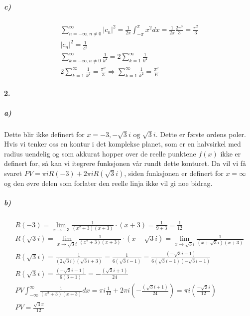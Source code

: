 \documentclass[11pt, A4paper,norsk]{article}
\begin{document}
			








			\subparagraph{c)}
				\begin{gather*}
\sum_{n = - \infty, n \neq 0}^{\infty} |c_n|^2 = \frac{1}{2 \pi} \int_{- \pi}^{\pi} x^2 dx = \frac{1}{2 \pi} \frac{2 \pi^3}{3} = \frac{\pi^2}{3} \\
|c_n|^2 = \frac{1}{c^2} \\
\sum_{k = - \infty, n \neq 0}^{\infty} \frac{1}{k^2} = 2 \sum_{k = 1}^{\infty} \frac{1}{k^2} \\
2 \sum_{k = 1}^{\infty} \frac{1}{k^2} = \frac{\pi^2}{3} \Rightarrow \sum_{k = 1}^{\infty} \frac{1}{k^2} = \frac{\pi^2}{6}
				\end{gather*}









		\paragraph{2.}
			\subparagraph{a)}
				\begin{flushleft}
Dette blir ikke definert for $x = - 3, - \sqrt{3}i \text{ og } \sqrt{3}i$. Dette er første ordens poler. Hvis vi tenker oss en kontur i det komplekse planet, som er en halvsirkel med radius uendelig og som akkurat hopper over de reelle punktene $f(x)$ ikke er definert for, så kan vi itegrere funksjonen vår rundt dette konturet. Da vil vi få svaret $PV = \pi i R(-3) + 2 \pi i R(\sqrt{3}i)$, siden funksjonen er definert for $x = \infty$ og den øvre delen som forlater den reelle linja ikke vil gi noe bidrag.
				\end{flushleft}










			\subparagraph{b)}
				\begin{gather*}
R(-3) = \lim_{x \rightarrow -3} \frac{1}{(x^2 + 3)(x + 3)} \cdot (x + 3) = \frac{1}{9 + 3} = \frac{1}{12} \\
R(\sqrt{3}i) = \lim_{x \rightarrow \sqrt{3}i} \frac{1}{(x^2 + 3)(x + 3)} \cdot (x - \sqrt{3}i) = \lim_{x \rightarrow \sqrt{3}i} \frac{1}{(x + \sqrt{3}i)(x + 3)} \\
R(\sqrt{3}i) = \frac{1}{(2 \sqrt{3}i)(\sqrt{3}i + 3)} = \frac{1}{6 (\sqrt{3}i - 1)} = \frac{(- \sqrt{3}i - 1)}{6 (\sqrt{3}i - 1)(- \sqrt{3}i - 1)} \\
R(\sqrt{3}i) = \frac{(- \sqrt{3}i - 1)}{6 (3 + 1)} = - \frac{(\sqrt{3}i + 1)}{24} \\
PV \int_{- \infty}^{\infty} \frac{1}{(x^2 + 3)(x + 3)} dx = \pi i \frac{1}{12} + 2 \pi i \left( - \frac{(\sqrt{3}i + 1)}{24} \right) = \pi i \left( \frac{- \sqrt{3}i}{12} \right) \\
PV = \frac{\sqrt{3} \pi}{12} \\
				\end{gather*}
\end{document}
